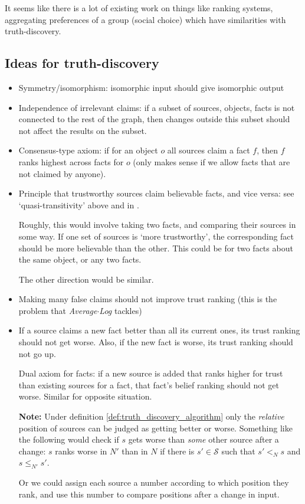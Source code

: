 \documentclass{article}
\theoremstyle{definition}
\theoremstyle{plain}
\theoremstyle{remark}
\begin{document}
It seems like there is a lot of existing work on things like ranking systems,
aggregating preferences of a group (social choice) which have similarities with
truth-discovery.

\subsection{Ideas for truth-discovery}
\begin{itemize}

\item Symmetry/isomorphism: isomorphic input should give isomorphic output

\item Independence of irrelevant claims: if a subset of sources, objects, facts
is not connected to the rest of the graph, then changes outside this subset
should not affect the results on the subset.

\item Consensus-type axiom: if for an object $o$ all sources claim a fact $f$,
then $f$ ranks highest across facts for $o$ (only makes sense if we allow facts
that are not claimed by anyone).

\item Principle that trustworthy sources claim believable facts, and vice
versa: see `quasi-transitivity' above and in \cite{altman_personalised}.

Roughly, this would involve taking two facts, and comparing their sources in
some way. If one set of sources is `more trustworthy', the corresponding fact
should be more believable than the other. This could be for two facts about the
same object, or any two facts.

The other direction would be similar.

\item Making many false claims should not improve trust ranking (this is the
problem that \emph{Average${\cdot}$Log} tackles)

\item If a source claims a new fact better than all its current ones, its trust
ranking should not get worse. Also, if the new fact is worse, its trust ranking
should not go up.

Dual axiom for facts: if a new source is added that ranks higher for trust than
existing sources for a fact, that fact's belief ranking should not get worse.
Similar for opposite situation.

\textbf{Note:} Under definition \ref{def:truth_discovery_algorithm} only the
\emph{relative} position of sources can be judged as getting better or worse.
Something like the following would check if $s$ gets worse than \emph{some}
other source after a change: $s$ ranks worse in $N'$ than in $N$ if there is
$s' \in \mathcal{S}$ such that $s' <_N s$ and $s \le_{N'} s'$.

Or we could assign each source a number according to which position they rank,
and use this number to compare positions after a change in input.

\end{itemize}

{}


\end{document}

